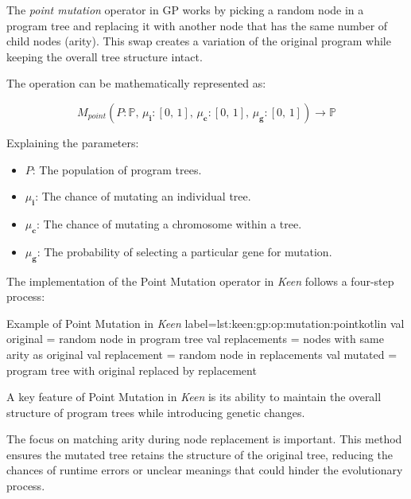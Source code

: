 \begin{definition}
    The \textit{point mutation} operator in GP works by picking a random node in a program tree and replacing it 
    with another node that has the same number of child nodes (arity). This swap creates a variation of the original 
    program while keeping the overall tree structure intact.

    The operation can be mathematically represented as:

    \begin{equation}
        M_{point}(P: \mathbb{P},\, \mu_\textbf{i}: [0,\, 1],\, \mu_\textbf{c}: [0,\, 1],\, \mu_\textbf{g}: [0,\, 1])
            \to \mathbb{P}
    \end{equation}

    Explaining the parameters:

    \begin{itemize}
        \item \(P\): The population of program trees.
        \item \(\mu_\textbf{i}\): The chance of mutating an individual tree.
        \item \(\mu_\textbf{c}\): The chance of mutating a chromosome within a tree.
        \item \(\mu_\textbf{g}\): The probability of selecting a particular gene for mutation.
    \end{itemize}
\end{definition}

The implementation of the Point Mutation operator in \textit{Keen} follows a four-step process:

\begin{code}{
    Example of Point Mutation in \textit{Keen}
}{label=lst:keen:gp:op:mutation:point}{kotlin}
    val original = random node in program tree
    val replacements = nodes with same arity as original
    val replacement = random node in replacements
    val mutated = program tree with original replaced by replacement
\end{code}

A key feature of Point Mutation in \textit{Keen} is its ability to maintain the overall structure of program trees 
while introducing genetic changes.

\begin{remark}
    The focus on matching arity during node replacement is important. This method ensures the mutated tree retains 
    the structure of the original tree, reducing the chances of runtime errors or unclear meanings that could hinder 
    the evolutionary process.
\end{remark}

